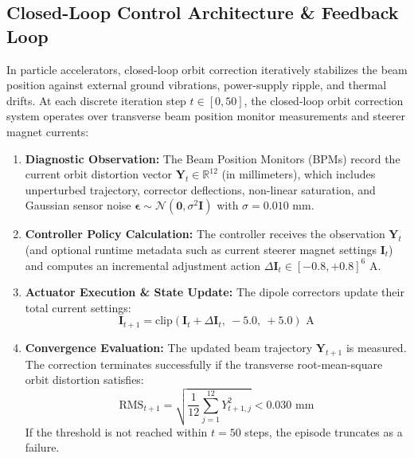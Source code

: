 \documentclass[11pt,a4paper]{article}
\begin{document}
\subsection{Closed-Loop Control Architecture \& Feedback Loop}
In particle accelerators, closed-loop orbit correction iteratively stabilizes the beam position against external ground vibrations, power-supply ripple, and thermal drifts. At each discrete iteration step $t \in [0, 50]$, the closed-loop orbit correction system operates over transverse beam position monitor measurements and steerer magnet currents:
\begin{enumerate}
    \item \textbf{Diagnostic Observation:} The Beam Position Monitors (BPMs) record the current orbit distortion vector $\mathbf{Y}_t \in \mathbb{R}^{12}$ (in millimeters), which includes unperturbed trajectory, corrector deflections, non-linear saturation, and Gaussian sensor noise $\boldsymbol{\epsilon} \sim \mathcal{N}(\mathbf{0}, \sigma^2 \mathbf{I})$ with $\sigma = 0.010\text{ mm}$.
    \item \textbf{Controller Policy Calculation:} The controller receives the observation $\mathbf{Y}_t$ (and optional runtime metadata such as current steerer magnet settings $\mathbf{I}_t$) and computes an incremental adjustment action $\Delta\mathbf{I}_t \in [-0.8, +0.8]^6\text{ A}$.
    \item \textbf{Actuator Execution \& State Update:} The dipole correctors update their total current settings:
    \begin{equation}
        \mathbf{I}_{t+1} = \text{clip}\left(\mathbf{I}_t + \Delta\mathbf{I}_t, \ -5.0, \ +5.0\right)\text{ A}
    \end{equation}
    \item \textbf{Convergence Evaluation:} The updated beam trajectory $\mathbf{Y}_{t+1}$ is measured. The correction terminates successfully if the transverse root-mean-square orbit distortion satisfies:
    \begin{equation}
        \text{RMS}_{t+1} = \sqrt{\frac{1}{12}\sum_{j=1}^{12} Y_{t+1, j}^2} < 0.030\text{ mm}
    \end{equation}
    If the threshold is not reached within $t = 50$ steps, the episode truncates as a failure.
\end{enumerate}
\end{document}
